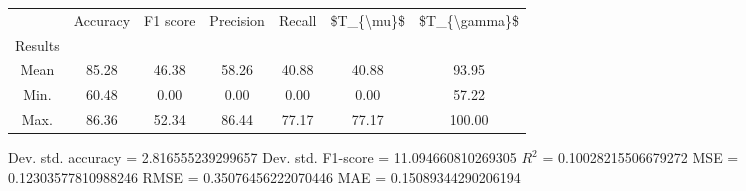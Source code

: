 \begin{tabular}{|c|c|c|c|c|c|c|}
\toprule
{} &  Accuracy &  F1 score &  Precision &  Recall &  \$T\_\{\textbackslash mu\}\$ &  \$T\_\{\textbackslash gamma\}\$ \\
Results &           &           &            &         &            &               \\
\hline
Mean    &     85.28 &     46.38 &      58.26 &   40.88 &      40.88 &         93.95 \\
Min.    &     60.48 &      0.00 &       0.00 &    0.00 &       0.00 &         57.22 \\
Max.    &     86.36 &     52.34 &      86.44 &   77.17 &      77.17 &        100.00 \\
\bottomrule
\end{tabular}

 Dev. std. accuracy = 2.816555239299657
 Dev. std. F1-score = 11.094660810269305
 $R^2$ = 0.10028215506679272
 MSE = 0.12303577810988246
 RMSE = 0.35076456222070446
 MAE = 0.15089344290206194